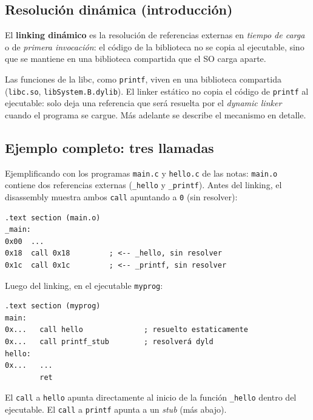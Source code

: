 \documentclass[11pt,a4paper]{article}
\begin{document}
\subsection{Resolución dinámica (introducción)}

\begin{definicion}
El \textbf{linking dinámico} es la resolución de referencias externas
en \emph{tiempo de carga} o de \emph{primera invocación}: el código
de la biblioteca no se copia al ejecutable, sino que se mantiene en
una biblioteca compartida que el SO carga aparte.
\end{definicion}

Las funciones de la libc, como \texttt{printf}, viven en una
biblioteca compartida (\texttt{libc.so}, \texttt{libSystem.B.dylib}).
El linker estático no copia el código de \texttt{printf} al
ejecutable: solo deja una referencia que será resuelta por el
\emph{dynamic linker} cuando el programa se cargue. Más adelante se
describe el mecanismo en detalle.

\subsection{Ejemplo completo: tres llamadas}

Ejemplificando con los programas \texttt{main.c} y \texttt{hello.c} de
las notas: \texttt{main.o} contiene dos referencias externas
(\texttt{\_hello} y \texttt{\_printf}). Antes del linking, el
disassembly muestra ambos \texttt{call} apuntando a \texttt{0} (sin
resolver):

\begin{lstlisting}[style=asmstyle]
.text section (main.o)
_main:
0x00  ...
0x18  call 0x18         ; <-- _hello, sin resolver
0x1c  call 0x1c         ; <-- _printf, sin resolver
\end{lstlisting}

Luego del linking, en el ejecutable \texttt{myprog}:

\begin{lstlisting}[style=asmstyle]
.text section (myprog)
main:
0x...   call hello              ; resuelto estaticamente
0x...   call printf_stub        ; resolverá dyld
hello:
0x...   ...
        ret
\end{lstlisting}

El \texttt{call} a \texttt{hello} apunta directamente al inicio de la
función \texttt{\_hello} dentro del ejecutable. El \texttt{call} a
\texttt{printf} apunta a un \emph{stub} (más abajo).

\end{document}
